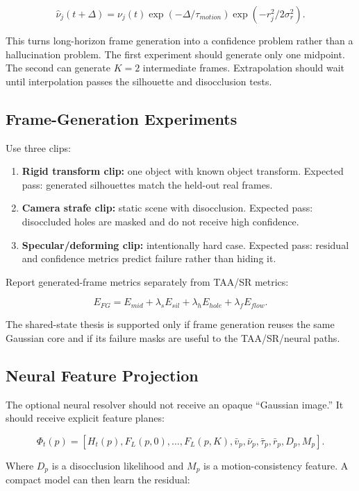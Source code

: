 \documentclass[11pt]{article}
\begin{document}
\[
  \hat{\nu}_j(t+\Delta) =
  \nu_j(t)
  \exp(-\Delta/\tau_{motion})
  \exp(-r_j^2/2\sigma_r^2).
\]

This turns long-horizon frame generation into a confidence problem rather than
a hallucination problem. The first experiment should generate only one
midpoint. The second can generate $K=2$ intermediate frames. Extrapolation
should wait until interpolation passes the silhouette and disocclusion tests.

\subsection{Frame-Generation Experiments}

Use three clips:

\begin{enumerate}
  \item \textbf{Rigid transform clip:} one object with known object transform.
        Expected pass: generated silhouettes match the held-out real frames.
  \item \textbf{Camera strafe clip:} static scene with disocclusion. Expected
        pass: disoccluded holes are masked and do not receive high confidence.
  \item \textbf{Specular/deforming clip:} intentionally hard case. Expected
        pass: residual and confidence metrics predict failure rather than
        hiding it.
\end{enumerate}

Report generated-frame metrics separately from TAA/SR metrics:

\[
  E_{FG} =
  E_{mid} + \lambda_sE_{sil}+\lambda_hE_{hole}
  + \lambda_fE_{flow}.
\]

The shared-state thesis is supported only if frame generation reuses the same
Gaussian core and if its failure masks are useful to the TAA/SR/neural paths.

\subsection{Neural Feature Projection}

The optional neural resolver should not receive an opaque ``Gaussian image.''
It should receive explicit feature planes:

\[
  \Phi_t(p) =
  [H_t(p), F_L(p,0),\ldots,F_L(p,K), \bar{v}_p,
   \bar{\nu}_p, \bar{\tau}_p, \bar{r}_p, D_p, M_p].
\]

Where $D_p$ is a disocclusion likelihood and $M_p$ is a motion-consistency
feature. A compact model can then learn the residual:
\end{document}
